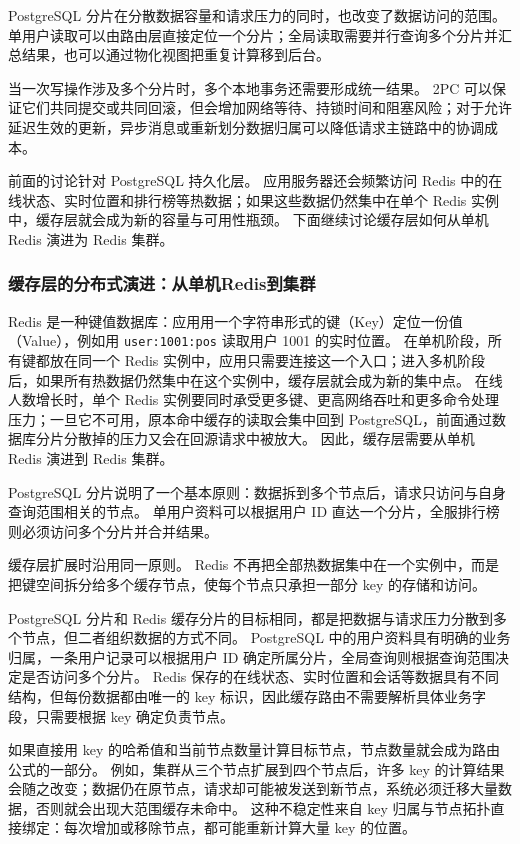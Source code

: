PostgreSQL 分片在分散数据容量和请求压力的同时，也改变了数据访问的范围。
单用户读取可以由路由层直接定位一个分片；全局读取需要并行查询多个分片并汇总结果，也可以通过物化视图把重复计算移到后台。

当一次写操作涉及多个分片时，多个本地事务还需要形成统一结果。
2PC 可以保证它们共同提交或共同回滚，但会增加网络等待、持锁时间和阻塞风险；对于允许延迟生效的更新，异步消息或重新划分数据归属可以降低请求主链路中的协调成本。

前面的讨论针对 PostgreSQL 持久化层。
应用服务器还会频繁访问 Redis 中的在线状态、实时位置和排行榜等热数据；如果这些数据仍然集中在单个 Redis 实例中，缓存层就会成为新的容量与可用性瓶颈。
下面继续讨论缓存层如何从单机 Redis 演进为 Redis 集群。

\subsubsection{缓存层的分布式演进：从单机Redis到集群}\label{sec4:redis-cluster-evolution}

Redis 是一种键值数据库：应用用一个字符串形式的键（Key）定位一份值（Value），例如用 \texttt{user:1001:pos} 读取用户 1001 的实时位置。
在单机阶段，所有键都放在同一个 Redis 实例中，应用只需要连接这一个入口；进入多机阶段后，如果所有热数据仍然集中在这个实例中，缓存层就会成为新的集中点。
在线人数增长时，单个 Redis 实例要同时承受更多键、更高网络吞吐和更多命令处理压力；一旦它不可用，原本命中缓存的读取会集中回到 PostgreSQL，前面通过数据库分片分散掉的压力又会在回源请求中被放大。
因此，缓存层需要从单机 Redis 演进到 Redis 集群。

PostgreSQL 分片说明了一个基本原则：数据拆到多个节点后，请求只访问与自身查询范围相关的节点。
单用户资料可以根据用户 ID 直达一个分片，全服排行榜则必须访问多个分片并合并结果。

缓存层扩展时沿用同一原则。
Redis 不再把全部热数据集中在一个实例中，而是把键空间拆分给多个缓存节点，使每个节点只承担一部分 key 的存储和访问。

PostgreSQL 分片和 Redis 缓存分片的目标相同，都是把数据与请求压力分散到多个节点，但二者组织数据的方式不同。
PostgreSQL 中的用户资料具有明确的业务归属，一条用户记录可以根据用户 ID 确定所属分片，全局查询则根据查询范围决定是否访问多个分片。
Redis 保存的在线状态、实时位置和会话等数据具有不同结构，但每份数据都由唯一的 key 标识，因此缓存路由不需要解析具体业务字段，只需要根据 key 确定负责节点。

如果直接用 key 的哈希值和当前节点数量计算目标节点，节点数量就会成为路由公式的一部分。
例如，集群从三个节点扩展到四个节点后，许多 key 的计算结果会随之改变；数据仍在原节点，请求却可能被发送到新节点，系统必须迁移大量数据，否则就会出现大范围缓存未命中。
这种不稳定性来自 key 归属与节点拓扑直接绑定：每次增加或移除节点，都可能重新计算大量 key 的位置。


